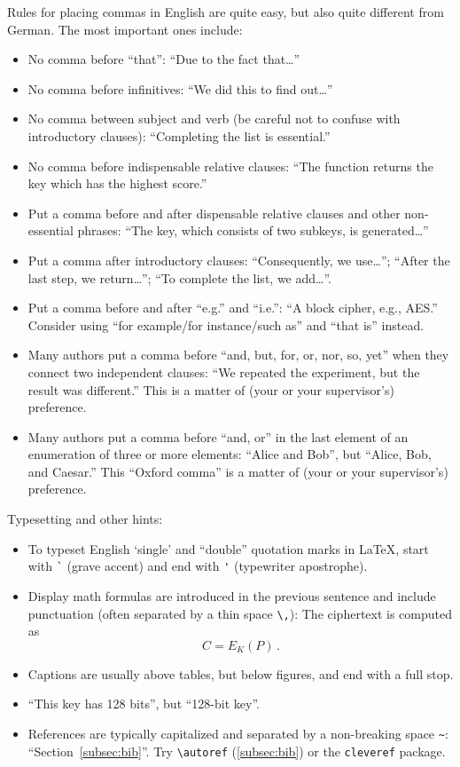 \documentclass[11pt,
  titlepage=false,
  abstract=on,
]{scrreprt}
\begin{document}
Rules for placing commas in English are quite easy, but also quite different from German.
The most important ones include:
\begin{itemize}
  \item No comma before ``that'': ``Due to the fact that\dots''
  \item No comma before infinitives: ``We did this to find out\dots''
  \item No comma between subject and verb (be careful not to confuse with introductory clauses): ``Completing the list is essential.''
  \item No comma before indispensable relative clauses: ``The function returns the key which has the highest score.''
  \item Put a comma before and after dispensable relative clauses and other non-essential phrases: ``The key, which consists of two subkeys, is generated\dots''
  \item Put a comma after introductory clauses: ``Consequently, we use\dots''; ``After the last step, we return\dots''; ``To complete the list, we add\dots''.
  \item Put a comma before and after ``e.g.'' and ``i.e.'': ``A block cipher, e.g., AES.''
    Consider using ``for example/for instance/such as'' and ``that is'' instead.
  \item Many authors put a comma before ``and, but, for, or, nor, so, yet'' when they connect two independent clauses: ``We repeated the experiment, but the result was different.''
    This is a matter of (your or your supervisor's) preference.
  \item Many authors put a comma before ``and, or'' in the last element of an enumeration of three or more elements: ``Alice and Bob'', but ``Alice, Bob, and Caesar.''
    This ``Oxford comma'' is a matter of (your or your supervisor's) preference.
\end{itemize}

Typesetting and other hints:
\begin{itemize}
  \item To typeset English `single' and ``double'' quotation marks in \LaTeX, start with \verb|`| (grave accent) and end with \verb|'| (typewriter apostrophe).
  \item Display math formulas are introduced in the previous sentence and include punctuation (often separated by a thin space \verb|\,|): The ciphertext is computed as
    \[C = E_K(P)\,.\]
  \item Captions are usually above tables, but below figures, and end with a full stop.
  \item ``This key has 128 bits'', but ``128-bit key''.
  \item References are typically capitalized and separated by a non-breaking space \verb|~|: ``Section~\ref{subsec:bib}''.
    Try \verb|\autoref| (\autoref{subsec:bib}) or the \verb|cleveref| package. %
\end{itemize}
\end{document}
